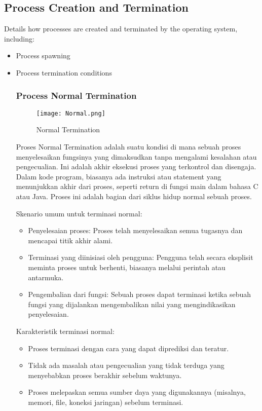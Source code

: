 \documentclass[12pt]{article}
\begin{document}
\subsection{Process Creation and Termination}
Details how processes are created and terminated by the operating system, including:
\begin{itemize}
    \item Process spawning
    \item Process termination conditions
    
    \subsubsection{Process Normal Termination}
    
    \begin{figure}
        \centering
        \texttt{[image: Normal.png]}
        \caption{Normal Termination}
        \label{fig:enter-label}
    \end{figure}
    
        \begin{itemize}
            Proses Normal Termination adalah suatu kondisi di mana sebuah proses menyelesaikan fungsinya yang dimaksudkan tanpa mengalami kesalahan atau pengecualian. Ini adalah akhir eksekusi proses yang terkontrol dan disengaja. Dalam kode program, biasanya ada instruksi atau statement yang menunjukkan akhir dari proses, seperti return di fungsi main dalam bahasa C atau Java. Proses ini adalah bagian dari siklus hidup normal sebuah proses.
        \end{itemize}
    
        Skenario umum untuk terminasi normal:
        \begin{itemize} 
            \item Penyelesaian proses: Proses telah menyelesaikan semua tugasnya dan mencapai titik akhir alami.
            \item Terminasi yang diinisiasi oleh pengguna: Pengguna telah secara eksplisit meminta proses untuk berhenti, biasanya melalui perintah atau antarmuka.
            \item Pengembalian dari fungsi: Sebuah proses dapat terminasi ketika sebuah fungsi yang dijalankan mengembalikan nilai yang mengindikasikan penyelesaian.
        \end{itemize}
    
        Karakteristik terminasi normal:
        \begin{itemize} 
            \item Proses terminasi dengan cara yang dapat diprediksi dan teratur.
            \item Tidak ada masalah atau pengecualian yang tidak terduga yang menyebabkan proses berakhir sebelum waktunya.
            \item Proses melepaskan semua sumber daya yang digunakannya (misalnya, memori, file, koneksi jaringan) sebelum terminasi.
        \end{itemize}
        

\end{itemize}
\end{document}
